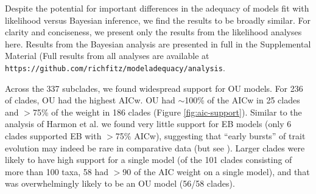 \documentclass[a4paper,12pt]{article}
\begin{document}
Despite the potential for important differences in the adequacy of models fit with likelihood versus Bayesian inference, we find the results to be broadly similar. For clarity and conciseness, we present only the results from the likelihood analyses here. Results from the Bayesian analysis are presented in full in the Supplemental Material (Full results from all analyses are available at \texttt{https://github.com/richfitz/modeladequacy/analysis}. 

Across the 337 subclades, we found widespread support for OU
models. For 236 of clades, OU had the highest AICw.
OU had $\sim$100\% of the AICw in 25 clades and $>$75\% of the weight in 186 clades (Figure \ref{fig:aic-support}). Similar to the analysis of Harmon et al. \citep{Harmon2010} we found very little support for EB models (only 6 clades supported EB with $>$75\% AICw), suggesting that ``early bursts'' of trait evolution may indeed be rare in comparative data (but see \citep{SlaterPennell}). Larger clades were
likely to have high support for a single model (of the 101 clades consisting of more than 100 taxa, 58 had $>$90 of the AIC weight on a single model),
and that was overwhelmingly likely to be an OU model (56/58 clades). 
\end{document}
